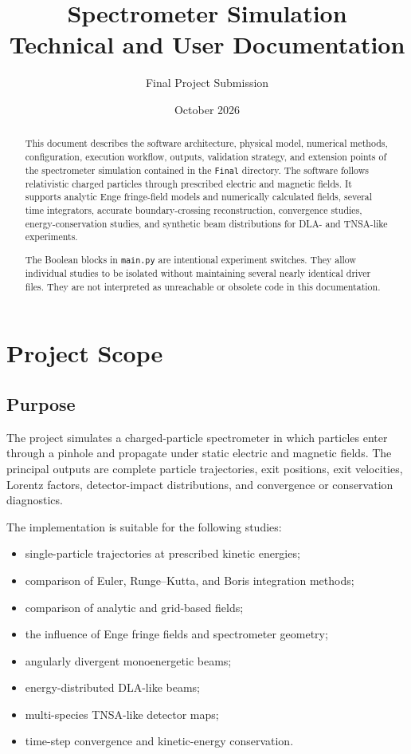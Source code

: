 \documentclass[11pt,a4paper]{report}
\title{Spectrometer Simulation\\Technical and User Documentation}
\author{Final Project Submission}
\date{October 2026}
\newcommand{\code}[1]{\texttt{#1}}
\begin{document}
\maketitle

\begin{abstract}
This document describes the software architecture, physical model, numerical
methods, configuration, execution workflow, outputs, validation strategy, and
extension points of the spectrometer simulation contained in the
\code{Final} directory.  The software follows relativistic charged particles
through prescribed electric and magnetic fields.  It supports analytic Enge
fringe-field models and numerically calculated fields, several time
integrators, accurate boundary-crossing reconstruction, convergence studies,
energy-conservation studies, and synthetic beam distributions for DLA- and
TNSA-like experiments.

The Boolean blocks in \code{main.py} are intentional experiment switches.
They allow individual studies to be isolated without maintaining several
nearly identical driver files.  They are not interpreted as unreachable or
obsolete code in this documentation.
\end{abstract}

\tableofcontents
\listoftables
\clearpage

\chapter{Project Scope}

\section{Purpose}
The project simulates a charged-particle spectrometer in which particles enter
through a pinhole and propagate under static electric and magnetic fields.
The principal outputs are complete particle trajectories, exit positions,
exit velocities, Lorentz factors, detector-impact distributions, and
convergence or conservation diagnostics.

The implementation is suitable for the following studies:
\begin{itemize}[noitemsep]
  \item single-particle trajectories at prescribed kinetic energies;
  \item comparison of Euler, Runge--Kutta, and Boris integration methods;
  \item comparison of analytic and grid-based fields;
  \item the influence of Enge fringe fields and spectrometer geometry;
  \item angularly divergent monoenergetic beams;
  \item energy-distributed DLA-like beams;
  \item multi-species TNSA-like detector maps;
  \item time-step convergence and kinetic-energy conservation.
\end{itemize}
\end{document}

